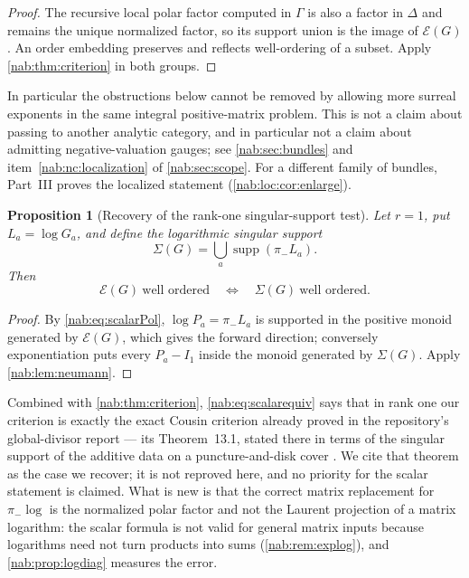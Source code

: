 \documentclass[11pt,letterpaper]{article}
\newtheorem{proposition}[proposition]{Proposition}
\theoremstyle{definition}
\theoremstyle{remark}
\newcommand{\supp}{\operatorname{supp}}
\newcommand{\EU}{\mathcal E}
\numberwithin{equation}{section}
\begin{document}
\begin{proof}
The recursive local polar factor computed in $\Gamma$ is also a factor in
$\Delta$ and remains the unique normalized factor, so its support union is the
image of $\EU(G)$. An order embedding preserves and reflects well-ordering of
a subset. Apply \cref{nab:thm:criterion} in both groups.
\end{proof}

In particular the obstructions below cannot be removed by allowing more
surreal exponents in the same integral positive-matrix problem. This is not a
claim about passing to another analytic category, and in particular not a
claim about admitting negative-valuation gauges; see
\cref{nab:sec:bundles} and item~\ref{nab:nc:localization} of
\cref{nab:sec:scope}. For a different family of bundles, Part~III proves the
localized statement (\cref{nab:loc:cor:enlarge}).

\begin{proposition}[Recovery of the rank-one singular-support test]
\label{nab:prop:rankone}
Let $r=1$, put $L_a=\log G_a$, and define the logarithmic singular support
\[
 \Sigma(G)=\bigcup_a\supp(\pi_-L_a).
\]
Then
\begin{equation}\label{nab:eq:scalarequiv}
 \EU(G)\ \text{well ordered}
 \quad\Longleftrightarrow\quad
 \Sigma(G)\ \text{well ordered}.
\end{equation}
\end{proposition}

\begin{proof}
By \eqref{nab:eq:scalarPol}, $\log P_a=\pi_-L_a$ is supported in the positive
monoid generated by $\EU(G)$, which gives the forward direction; conversely
exponentiation puts every $P_a-I_1$ inside the monoid generated by
$\Sigma(G)$. Apply \cref{nab:lem:neumann}.
\end{proof}

Combined with \cref{nab:thm:criterion}, \eqref{nab:eq:scalarequiv} says that
in rank one our criterion is exactly the exact Cousin criterion already proved
in the repository's global-divisor report --- its Theorem~13.1, stated there in
terms of the singular support of the additive data on a puncture-and-disk
cover \cite{RepoGlobal}. We cite that theorem as the case we recover; it is not
reproved here, and no priority for the scalar statement is claimed. What is
new is that the correct matrix replacement for $\pi_-\log$ is the normalized
polar factor and not the Laurent projection of a matrix logarithm: the scalar
formula is not valid for general matrix inputs because logarithms need not
turn products into sums (\cref{nab:rem:explog}), and
\cref{nab:prop:logdiag} measures the error.
\end{document}
